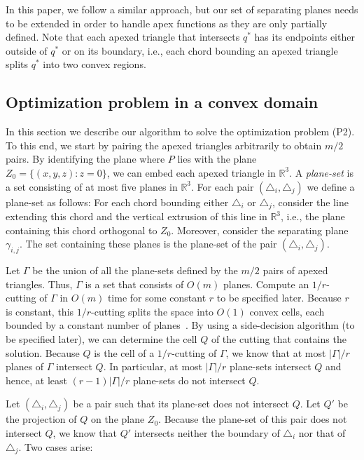 \documentclass[a4paper,UKenglish]{lipics}
\begin{document}
In this paper, we follow a similar approach, but our set of separating planes needs to be extended in order to handle apex functions as they are only partially defined.
Note that each apexed triangle that intersects $q^*$ has its endpoints either outside of $q^*$ or on its boundary, i.e., each chord bounding an apexed triangle splits $q^*$ into two convex regions.

\subsection{Optimization problem in a convex domain}
In this section we describe our algorithm to solve the optimization problem (P2). 
To this end, we start by pairing the apexed triangles arbitrarily to obtain $m/2$ pairs.
By identifying the plane where $P$ lies with the plane $Z_0 = \{(x,y,z): z = 0\}$, we can embed each apexed triangle in $\mathbb{R}^3$.
A \emph{plane-set} is a set consisting of at most five planes in $\mathbb{R}^3$.
For each pair $(\triangle_i, \triangle_j)$ we define a plane-set as follows: 
For each chord bounding either $\triangle_i$ or $\triangle_j$, consider the line extending this chord and the vertical extrusion of this line in $\mathbb{R}^3$, i.e.,  the plane containing this chord orthogonal to $Z_0$. Moreover, consider the separating plane~$\gamma_{i,j}$. The set containing these planes is the plane-set of the pair $(\triangle_i, \triangle_j)$.

Let $\Gamma$ be the union of all the plane-sets defined by the $m/2$ pairs of apexed triangles. Thus, $\Gamma$ is a set that consists of $O(m)$ planes. Compute an $1/r$-cutting of $\Gamma$ in $O(m)$ time for some constant $r$ to be specified later.
Because $r$ is constant, this $1/r$-cutting splits the space into $O(1)$ convex cells, each bounded by a constant number of planes~\cite{matousekCuttings}. 
By using a side-decision algorithm (to be specified later), we can determine the cell $Q$ of the cutting that contains the solution. Because $Q$ is the cell of a $1/r$-cutting of $\Gamma$, we know that at most $|\Gamma|/r$ planes of $\Gamma$ intersect $Q$. In particular, at most $|\Gamma|/r$ plane-sets intersect $Q$ and hence, at least $(r-1)|\Gamma|/r$ plane-sets do not intersect $Q$. 

Let $(\triangle_i, \triangle_j)$ be a pair such that its plane-set does not intersect $Q$. 
Let $Q'$ be the projection of $Q$ on the plane $Z_0$. Because the plane-set of this pair does not intersect $Q$, we know that $Q'$ intersects neither the boundary of $\triangle_i$ nor that of $\triangle_j$.
Two cases arise:
\end{document}
